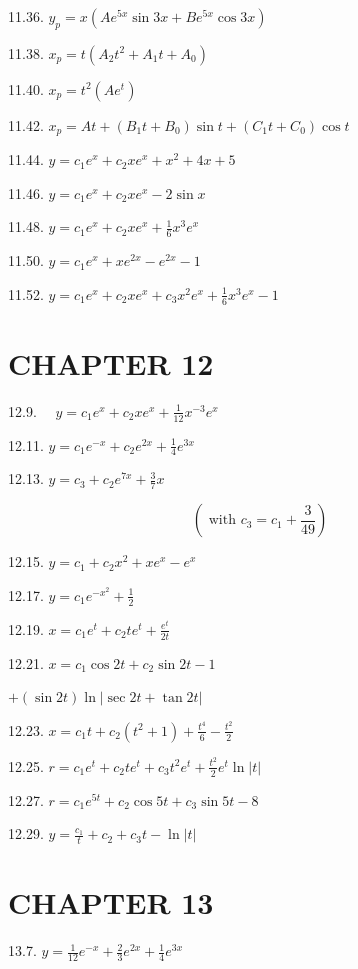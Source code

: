 \documentclass[10pt]{article}
\begin{document}
11.36. $y_{p}=x\left(A e^{5 x} \sin 3 x+B e^{5 x} \cos 3 x\right)$

11.38. $x_{p}=t\left(A_{2} t^{2}+A_{1} t+A_{0}\right)$

11.40. $x_{p}=t^{2}\left(A e^{t}\right)$

11.42. $x_{p}=A t+\left(B_{1} t+B_{0}\right) \sin t+\left(C_{1} t+C_{0}\right) \cos t$

11.44. $y=c_{1} e^{x}+c_{2} x e^{x}+x^{2}+4 x+5$

11.46. $y=c_{1} e^{x}+c_{2} x e^{x}-2 \sin x$

11.48. $y=c_{1} e^{x}+c_{2} x e^{x}+\frac{1}{6} x^{3} e^{x}$

11.50. $y=c_{1} e^{x}+x e^{2 x}-e^{2 x}-1$

11.52. $y=c_{1} e^{x}+c_{2} x e^{x}+c_{3} x^{2} e^{x}+\frac{1}{6} x^{3} e^{x}-1$

\section*{CHAPTER 12}
12.9. $\quad y=c_{1} e^{x}+c_{2} x e^{x}+\frac{1}{12} x^{-3} e^{x}$

12.11. $y=c_{1} e^{-x}+c_{2} e^{2 x}+\frac{1}{4} e^{3 x}$

12.13. $y=c_{3}+c_{2} e^{7 x}+\frac{3}{7} x$

$$
\left(\text { with } c_{3}=c_{1}+\frac{3}{49}\right)
$$

12.15. $y=c_{1}+c_{2} x^{2}+x e^{x}-e^{x}$

12.17. $y=c_{1} e^{-x^{2}}+\frac{1}{2}$

12.19. $x=c_{1} e^{t}+c_{2} t e^{t}+\frac{e^{t}}{2 t}$

12.21. $x=c_{1} \cos 2 t+c_{2} \sin 2 t-1$

$+(\sin 2 t) \ln |\sec 2 t+\tan 2 t|$

12.23. $x=c_{1} t+c_{2}\left(t^{2}+1\right)+\frac{t^{4}}{6}-\frac{t^{2}}{2}$

12.25. $r=c_{1} e^{t}+c_{2} t e^{t}+c_{3} t^{2} e^{t}+\frac{t^{2}}{2} e^{t} \ln |t|$

12.27. $r=c_{1} e^{5 t}+c_{2} \cos 5 t+c_{3} \sin 5 t-8$

12.29. $y=\frac{c_{1}}{t}+c_{2}+c_{3} t-\ln |t|$

\section*{CHAPTER 13}
13.7. $y=\frac{1}{12} e^{-x}+\frac{2}{3} e^{2 x}+\frac{1}{4} e^{3 x}$
\end{document}
